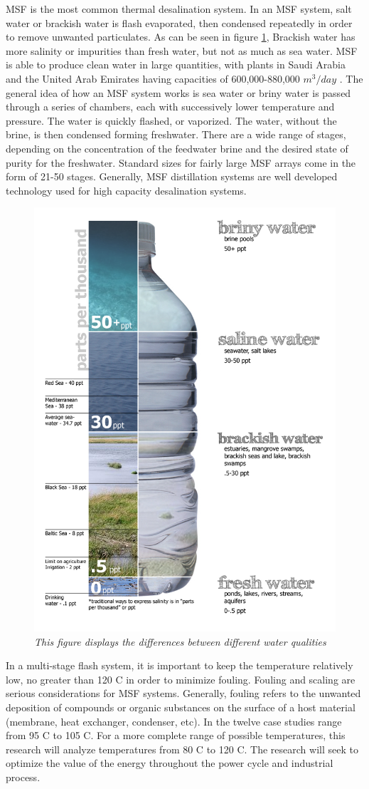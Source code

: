 \documentclass[12pt]{UIdahoMastersThesis}
\begin{document}
MSF is the most common thermal desalination system. In an MSF system, salt water or brackish water is flash evaporated, then condensed repeatedly in order to remove unwanted particulates. As can be seen in figure \ref{salinity}, Brackish water has more salinity or impurities than fresh water, but not as much as sea water. MSF is able to produce clean water in large quantities, with plants in Saudi Arabia and the United Arab Emirates having capacities of 600,000-880,000 $m^3/day$ \cite{El-Dessouky2016}. The general idea of how an MSF system works is sea water or briny water is passed through a series of chambers, each with successively lower temperature and pressure.  The water is quickly flashed, or vaporized.  The water, without the brine, is then condensed forming freshwater.  There are a wide range of stages, depending on the concentration of the feedwater brine and the desired state of purity for the freshwater. Standard sizes for fairly large MSF arrays come in the form of 21-50 stages. Generally, MSF distillation systems are well developed technology used for high capacity desalination systems.
\begin{figure}[h!]
\centering
\label{salinity}
\includegraphics[width=.25\textwidth]{Water_salinity_diagram.png}
\caption{\small \sl This figure displays the differences between different water qualities}
\end{figure}


In a multi-stage flash system, it is important to keep the temperature relatively low, no greater than 120 \degree C in order to minimize fouling. Fouling and scaling are serious considerations for MSF systems.  Generally, fouling refers to the unwanted deposition of compounds or organic substances on the surface of a host material (membrane, heat exchanger, condenser, etc)\cite{Khayet2016}. In \cite{El-Dessouky2016} the twelve case studies range from 95 \degree C to 105 \degree C. For a more complete range of possible temperatures, this research will analyze temperatures from 80 \degree C to 120 \degree C. The research will seek to optimize the value of the energy throughout the power cycle and industrial process.
\end{document}
